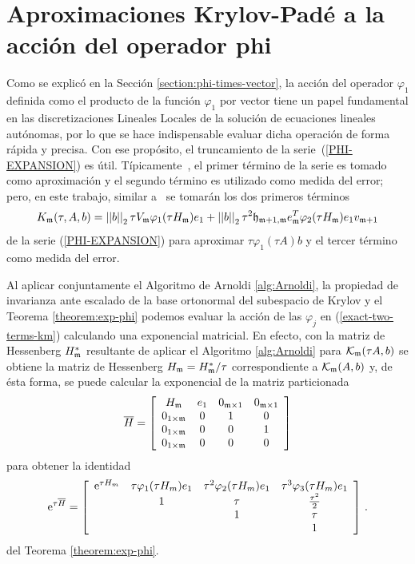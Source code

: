 \section{Aproximaciones Krylov-Padé a la acción del operador phi}\label{section:krylov-pade-approx}

Como se explicó en la Sección \ref{section:phi-times-vector}, la acción del operador $\varphi_1$ definida como el producto de la función $\varphi_1$ por vector tiene un papel fundamental en las discretizaciones Lineales Locales de la solución de ecuaciones lineales autónomas, por lo que se hace indispensable evaluar dicha operación de forma rápida y precisa. Con ese propósito, el truncamiento de la serie~(\ref{PHI-EXPANSION}) es útil. Típicamente~\cite{niesen2012algorithm,sidje1998expokit,tokman2006efficient}, el primer término de la serie es tomado como aproximación y el segundo término es utilizado como medida del error; pero, en este trabajo, similar a~\cite{Saad92} se tomarán los dos primeros términos
 \begin{equation}\label{exact-two-terms-km}
    K_{\mathfrak{m}}(\tau,A,b) = \left\lvert \left\lvert  b  \right\rvert \right\rvert_2\tau V_{\mathfrak{m}}\varphi_1(\tau H_{\mathfrak{m}})e_1 + \left\lvert \left\lvert  b  \right\rvert \right\rvert_2\tau^2\mathfrak{h}_{\mathfrak{m}+1,\mathfrak{m}}e^T_{\mathfrak{m}}\varphi_2(\tau H_{\mathfrak{m}})e_1v_{\mathfrak{m}+1}
 \end{equation}
de la serie (\ref{PHI-EXPANSION}) para aproximar $\tau\varphi_1(\tau A)b$ y el tercer término como medida del error.

Al aplicar conjuntamente el Algoritmo de Arnoldi \ref{alg:Arnoldi}, la propiedad de invarianza ante escalado de la base ortonormal del subespacio de Krylov y el Teorema \ref{theorem:exp-phi} podemos evaluar la acción de las $\varphi_j$ en (\ref{exact-two-terms-km}) calculando una exponencial matricial. En efecto, con la matriz de Hessenberg $H^*_{\mathfrak{m}}$ resultante de aplicar el Algoritmo \ref{alg:Arnoldi} para $\mathcal{K}_{\mathfrak{m}}(\tau A,b)$ se obtiene la matriz de Hessenberg $H_{\mathfrak{m}}=H^*_{\mathfrak{m}}/\tau$ correspondiente a $\mathcal{K}_{\mathfrak{m}}(A,b)$ y, de ésta forma, se puede calcular la exponencial de la matriz particionada
\begin{equation}
    \overline{H} = \left[\begin{array}{cccc}
    H_{\mathfrak{m}} & e_1 & 0_{\mathfrak{m}\times 1} & 0_{\mathfrak{m}\times 1}\\
    0_{1\times\mathfrak{m}} & 0 & 1 & 0\\
    0_{1\times\mathfrak{m}} & 0 & 0 & 1\\
    0_{1\times\mathfrak{m}} & 0 & 0 & 0
    \end{array}\right] \label{hhat_hessenberg_matrix}
    \end{equation}
para obtener la identidad
\begin{equation}
    \mathrm{e}^{\tau\overline{H}} = \left[\begin{array}{cccc}
    \mathrm{e}^{\tau H_m} & \tau\varphi_1(\tau H_m)e_1 & \tau^{2}\varphi_2(\tau H_m)e_1 &
    \tau^{3}\varphi_3(\tau H_m)e_1 \\
    & 1 & \tau & \frac{\tau^{2}}{2}\\
    &  & 1 & \tau \\
    &   &   & 1 \\
    \end{array}\right] \,. \label{phi_hhat_exponential}
\end{equation}
del Teorema \ref{theorem:exp-phi}.

